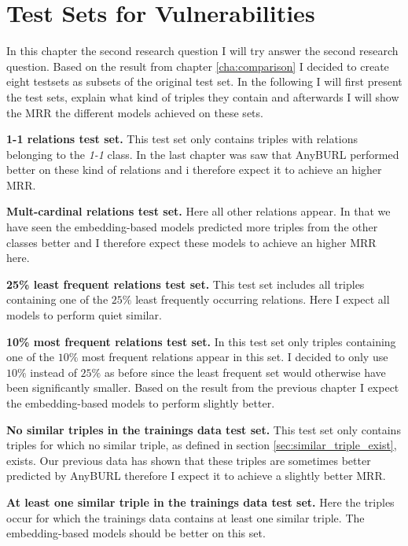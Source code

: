 \chapter{Test Sets for Vulnerabilities}
\label{cha:testsets}
In this chapter the second research question I will try answer the second research question. Based on the result from chapter \ref{cha:comparison} I decided to create eight testsets as subsets of the original test set. In the following I will first present the test sets, explain what kind of triples they contain and afterwards I will show the MRR the different models achieved on these sets. \newline

\textbf{1-1 relations test set.} This test set only contains triples with relations belonging to the \textit{1-1} class. In the last chapter was saw that AnyBURL performed better on these kind of relations and i therefore expect it to achieve an higher MRR.

\textbf{Mult-cardinal relations test set.} Here all other relations appear. In that we have seen the embedding-based models predicted more triples from the other classes better and I therefore expect these models to achieve an higher MRR here.

\textbf{25\% least frequent relations test set.} This test set includes all triples containing one of the $25\%$ least frequently occurring relations. Here I expect all models to perform quiet similar.

\textbf{10\% most frequent relations test set.} In this test set only triples containing one of the $10\%$ most frequent relations appear in this set. I decided to only use $10\%$ instead of $25\%$ as before since the least frequent set would otherwise have been significantly smaller. Based on the result from the previous chapter I expect the embedding-based models to perform slightly better.

\textbf{No similar triples in the trainings data test set.} This test set only contains triples for which no similar triple, as defined in section \ref{sec:similar_triple_exist}, exists. Our previous data has shown that these triples are sometimes better predicted by AnyBURL therefore I expect it to achieve a slightly better MRR. 

\textbf{At least one similar triple in the trainings data test set.} Here the triples occur for which the trainings data contains at least one similar triple. The embedding-based models should be better on this set.

